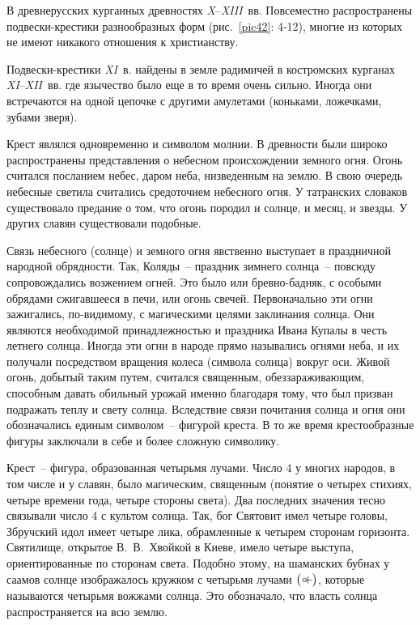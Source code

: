 \documentclass[pscyr,titlepage,chapters]{hedreport}
\begin{document}
  В древнерусских курганных древностях \emph{X}--\emph{XIII}~вв. Повсеместно
  распространены подвески-крестики разнообразных форм (рис.~\ref{pic42}: 4-12),
  многие из которых не имеют никакого отношения к христианству.

  Подвески-крестики \emph{XI}~в. найдены в земле радимичей в костромских
  курганах \emph{XI}--\emph{XII}~вв. где язычество было еще в то время очень
  сильно. Иногда они встречаются на одной цепочке с другими амулетами (коньками,
  ложечками, зубами зверя).

  Крест являлся одновременно и символом молнии. В древности были широко
  распространены представления о небесном происхождении земного огня. Огонь
  считался посланием небес, даром неба, низведенным на землю. В свою очередь
  небесные светила считались средоточием небесного огня. У татранских словаков
  существовало предание о том, что огонь породил и солнце, и месяц, и звезды. У
  других славян существовали подобные.

  Связь небесного (солнце) и земного огня явственно выступает в праздничной
  народной обрядности. Так, Коляды~-- праздник зимнего солнца~-- повсюду
  сопровождались возжением огней. Это было или бревно-бадняк, с особыми обрядами
  сжигавшееся в печи, или огонь свечей. Первоначально эти огни зажигались,
  по-видимому, с магическими целями заклинания солнца. Они являются необходимой
  принадлежностью и праздника Ивана Купалы в честь летнего солнца. Иногда эти
  огни в народе прямо назывались огнями неба, и их получали посредством вращения
  колеса (символа солнца) вокруг оси. Живой огонь, добытый таким путем, считался
  священным, обеззараживающим, способным давать обильный урожай именно благодаря
  тому, что был призван подражать теплу и свету солнца. Вследствие связи
  почитания солнца и огня они обозначались единым символом~-- фигурой креста. В
  то же время крестообразные фигуры заключали в себе и более сложную символику.

  Крест~-- фигура, образованная четырьмя лучами. Число 4 у многих народов, в том
  числе и у славян, было магическим, священным (понятие о четырех стихиях,
  четыре времени года, четыре стороны света). Два последних значения тесно
  связывали число 4 с культом солнца. Так, бог Святовит имел четыре головы,
  Збручский идол имеет четыре лика, обрамленные к четырем сторонам горизонта.
  Святилище, открытое В.~В.~Хвойкой в Киеве, имело четыре выступа,
  ориентированные по сторонам света. Подобно этому, на шаманских бубнах у саамов
  солнце изображалось кружком с четырьмя лучами
  \( \big(+\hspace{-11.6pt}\circ \hspace{4pt}\big) \), 
  которые называются четырьмя вожжами солнца. Это обозначало, что власть солнца
  распространяется на всю землю.
\end{document}
